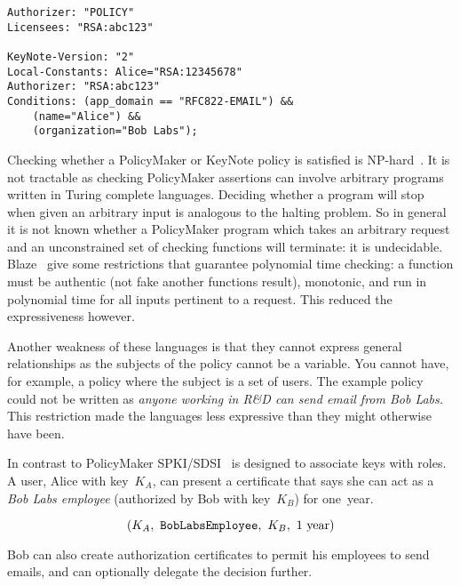 \documentclass[thesis.tex]{subfiles}
\begin{document}
\begin{lstlisting}
Authorizer: "POLICY"
Licensees: "RSA:abc123"

KeyNote-Version: "2"
Local-Constants: Alice="RSA:12345678" 
Authorizer: "RSA:abc123"
Conditions: (app_domain == "RFC822-EMAIL") &&
    (name="Alice") &&
    (organization="Bob Labs");
\end{lstlisting}

Checking whether a PolicyMaker or KeyNote policy is satisfied is
NP-hard~\cite{blaze_compliance_1998}.  It is not tractable as checking
PolicyMaker assertions can involve arbitrary programs written in
Turing complete languages.  Deciding whether a program will stop when
given an arbitrary input is analogous to the halting problem.  So in
general it is not known whether a PolicyMaker program which takes an
arbitrary request and an unconstrained set of checking functions will
terminate: it is undecidable.  Blaze~\etal{} give
some restrictions that guarantee polynomial time checking: a function
must be authentic (not fake another functions result), monotonic, and
run in polynomial time for all inputs pertinent to a request.  This
reduced the expressiveness however.

Another weakness of these languages is that they cannot express
general relationships as the subjects of the policy cannot be a
variable.  You cannot have, for example, a policy where the subject is
a set of users.  The example policy could not be written as
\emph{anyone working in R\&D can send email from Bob Labs.}  This
restriction made the languages less expressive than they might
otherwise have been.


In contrast to PolicyMaker SPKI/SDSI~\cite{ellison_spki_1999} is
designed to associate keys with roles.  A user, Alice with key~$K_A$,
can present a certificate that says she can act as a \emph{Bob Labs
employee} (authorized by Bob with key~$K_B$) for one~year.

\begin{equation*}
  (K_A,~\text{\tt BobLabsEmployee},~K_B,~1~\text{year})
\end{equation*}

Bob can also create authorization certificates to permit his employees
to send emails, and can optionally delegate the decision further.
\end{document}
